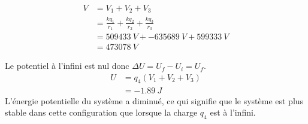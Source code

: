 \begin{reponsebox}
  \begin{align*}
    V &= V_1 + V_2 + V_3 \\
      &= \frac{kq_1}{r_1} + \frac{kq_2}{r_2} + \frac{kq_3}{r_3} \\
      &= \SI{509433}{V} + \SI{-635689}{V} + \SI{599333}{V}  \\
      &= \SI{473078}{V}
  \end{align*}

  Le potentiel à l'infini est nul donc $\Delta U = U_f - U_i = U_f$.
  \begin{align*}
    U &= q_4 (V_1 + V_2 + V_3)  \\
      &= \SI{-1.89}{J}
  \end{align*}
  L'énergie potentielle du système a diminué, ce qui signifie que le système
  est plus stable dans cette configuration que lorsque la charge $q_4$ est à
  l'infini.
\end{reponsebox}
